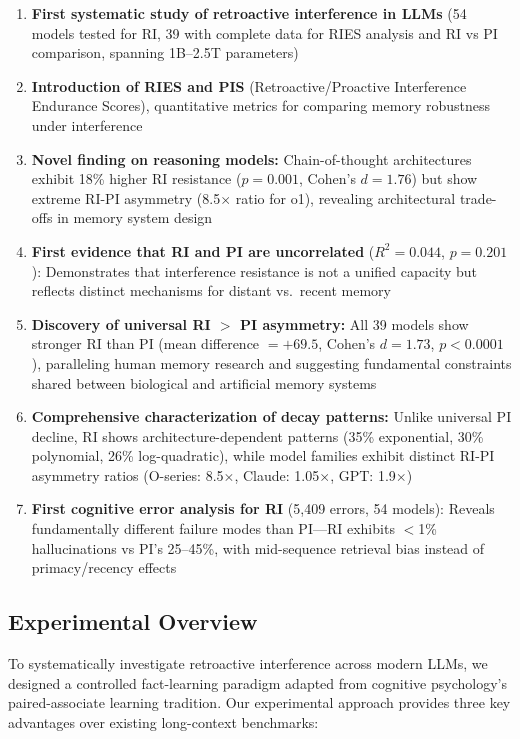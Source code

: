 \documentclass{article}
\begin{document}
\begin{enumerate}[itemsep=2pt,topsep=3pt,parsep=0pt]
    \item \textbf{First systematic study of retroactive interference in LLMs} (54 models tested for RI, 39 with complete data for RIES analysis and RI vs PI comparison, spanning 1B--2.5T parameters)
    \item \textbf{Introduction of RIES and PIS} (Retroactive/Proactive Interference Endurance Scores), quantitative metrics for comparing memory robustness under interference
    \item \textbf{Novel finding on reasoning models:} Chain-of-thought architectures exhibit 18\% higher RI resistance ($p = 0.001$, Cohen's $d = 1.76$) but show extreme RI-PI asymmetry (8.5$\times$ ratio for o1), revealing architectural trade-offs in memory system design
    \item \textbf{First evidence that RI and PI are uncorrelated} ($R^2 = 0.044$, $p = 0.201$): Demonstrates that interference resistance is not a unified capacity but reflects distinct mechanisms for distant vs.\ recent memory
    \item \textbf{Discovery of universal RI $>$ PI asymmetry:} All 39 models show stronger RI than PI (mean difference $= +69.5$, Cohen's $d = 1.73$, $p < 0.0001$), paralleling human memory research and suggesting fundamental constraints shared between biological and artificial memory systems
    \item \textbf{Comprehensive characterization of decay patterns:} Unlike universal PI decline, RI shows architecture-dependent patterns (35\% exponential, 30\% polynomial, 26\% log-quadratic), while model families exhibit distinct RI-PI asymmetry ratios (O-series: 8.5$\times$, Claude: 1.05$\times$, GPT: 1.9$\times$)
    \item \textbf{First cognitive error analysis for RI} (5,409 errors, 54 models): Reveals fundamentally different failure modes than PI---RI exhibits $<$1\% hallucinations vs PI's 25--45\%, with mid-sequence retrieval bias instead of primacy/recency effects
\end{enumerate}

\subsection{Experimental Overview}

To systematically investigate retroactive interference across modern LLMs, we designed a controlled fact-learning paradigm adapted from cognitive psychology's paired-associate learning tradition. Our experimental approach provides three key advantages over existing long-context benchmarks:
\end{document}
